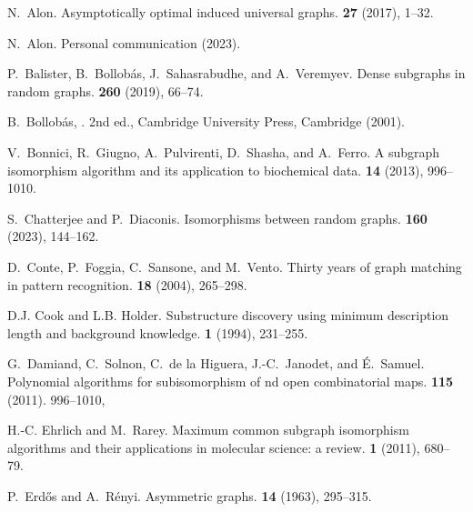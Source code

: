 \documentclass{article}
\begin{document}
\footnotesize
\begin{thebibliography}{10}

N.~Alon. 
\newblock Asymptotically optimal induced universal graphs. 
 {\bf 27} (2017), 1--32.

N.~Alon. 
\newblock Personal communication (2023).

P.~Balister, B.~Bollob{\'a}s, J.~Sahasrabudhe, and A.~Veremyev.
\newblock Dense subgraphs in random graphs.
 {\bf 260} (2019), 66--74.

B.~Bollob{\'a}s,
.
\newblock 2nd ed., Cambridge University Press, Cambridge (2001). 

V.~Bonnici, R.~Giugno, A.~Pulvirenti, D.~Shasha, and A.~Ferro.
\newblock A subgraph isomorphism algorithm and its application to biochemical data.
 {\bf 14} (2013), 996--1010.

S.~Chatterjee and P.~Diaconis.
\newblock Isomorphisms between random graphs.
 {\bf 160} (2023), 144--162.

D.~Conte, P.~Foggia, C.~Sansone, and M.~Vento.
\newblock Thirty years of graph matching in pattern recognition.
 {\bf 18} (2004), 265--298.

D.J. Cook and L.B. Holder.
\newblock Substructure discovery using minimum description length and background knowledge.
 {\bf 1} (1994), 231--255.

G.~Damiand, C.~Solnon, C.~{de la Higuera}, J.-C.~Janodet, and É.~Samuel.
\newblock Polynomial algorithms for subisomorphism of nd open combinatorial maps.
 {\bf 115} (2011). 996--1010,

H.-C. Ehrlich and M.~Rarey.
\newblock Maximum common subgraph isomorphism algorithms and their applications in molecular science: a review.
 {\bf 1} (2011), 680--79.

P.~Erd{\H{o}}s and A.~R{\'e}nyi.
\newblock Asymmetric graphs.
 {\bf 14} (1963), 295--315.


\end{thebibliography}
\end{document}

